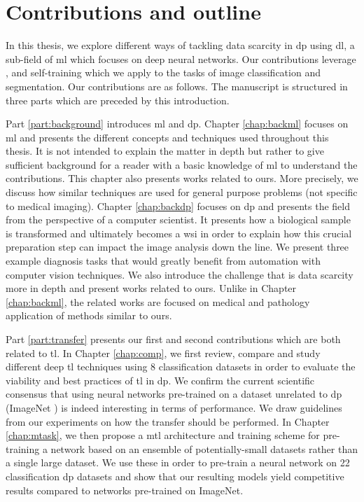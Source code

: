 \section{Contributions and outline}

In this thesis, we explore different ways of tackling data scarcity in \acrlong{dp} using \acrlong{dl}, a sub-field of \acrlong{ml} which focuses on deep neural networks. Our contributions leverage ,  and self-training which we apply to the tasks of image classification and segmentation. Our contributions are as follows. The manuscript is structured in three parts which are preceded by this introduction.

Part \ref{part:background} introduces \acrlong{ml} and \acrlong{dp}. Chapter \ref{chap:backml} focuses on \acrlong{ml} and presents the different concepts and techniques used throughout this thesis. It is not intended to explain the matter in depth but rather to give sufficient background for a reader with a basic knowledge of \acrlong{ml} to understand the contributions. This chapter also presents works related to ours. More precisely, we discuss how similar techniques are used for general purpose problems (\ie not specific to medical imaging). Chapter \ref{chap:backdp} focuses on \acrlong{dp} and presents the field from the perspective of a computer scientist. It presents how a biological sample is transformed and ultimately becomes a \acrlong{wsi} in order to explain how this crucial preparation step can impact the image analysis down the line. We present three example diagnosis tasks that would greatly benefit from automation with computer vision techniques. We also introduce the challenge that is data scarcity more in depth and present works related to ours. Unlike in Chapter \ref{chap:backml}, the related works are focused on medical and pathology application of methods similar to ours.

Part \ref{part:transfer} presents our first and second contributions which are both related to \acrlong{tl}. In Chapter \ref{chap:comp}, we first review, compare and study different deep \acrlong{tl} techniques using 8 classification datasets in order to evaluate the viability and best practices of \acrlong{tl} in \acrlong{dp}. We confirm the current scientific consensus that using neural networks pre-trained on a dataset unrelated to \acrlong{dp} (\ie ImageNet \cite{deng2009imagenet}) is indeed interesting in terms of performance. We draw guidelines from our experiments on how the transfer should be performed. In Chapter \ref{chap:mtask}, we then propose a \acrlong{mtl} architecture and training scheme for pre-training a network based on an ensemble of potentially-small datasets rather than a single large dataset. We use these in order to pre-train a neural network on 22 classification \acrlong{dp} datasets and show that our resulting models yield competitive results compared to networks pre-trained on ImageNet. 

